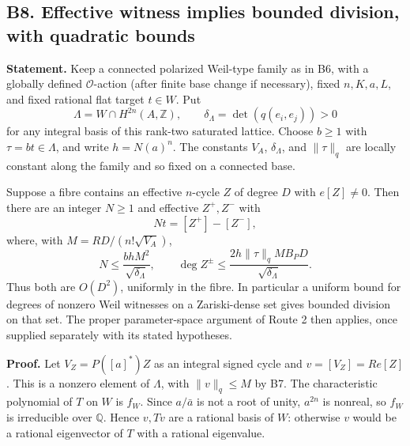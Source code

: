 \documentclass[11pt,a4paper]{article}
\theoremstyle{definition}
\begin{document}
\subsection{B8. Effective witness implies bounded division, with quadratic bounds}\label{b8.-effective-witness-implies-bounded-division-with-quadratic-bounds}

\textbf{Statement.} Keep a connected polarized Weil-type family as in B6, with a globally defined \(\mathcal O\)-action (after finite base change if necessary), fixed \(n,K,a,L\), and fixed rational flat target \(t\in W\). Put \[
 \Lambda=W\cap H^{2n}(A,\mathbb Z),\qquad \delta_\Lambda=\det(q(e_i,e_j))>0
\] for any integral basis of this rank-two saturated lattice. Choose \(b\geq1\) with \(\tau=bt\in\Lambda\), and write \(h=N(a)^n\). The constants \(V_A\), \(\delta_\Lambda\), and \(\|\tau\|_q\) are locally constant along the family and so fixed on a connected base.

Suppose a fibre contains an effective \(n\)-cycle \(Z\) of degree \(D\) with \(e[Z]\ne0\). Then there are an integer \(N\geq1\) and effective \(Z^+,Z^-\) with \[
 Nt=[Z^+]-[Z^-],
\] where, with \(M=RD/(n!\sqrt{V_A})\), \[
 N\leq\frac{b h M^2}{\sqrt{\delta_\Lambda}},\qquad
 \deg Z^\pm\leq\frac{2h\|\tau\|_q M B_P D}{\sqrt{\delta_\Lambda}}.
\] Thus both are \(O(D^2)\), uniformly in the fibre. In particular a uniform bound for degrees of nonzero Weil witnesses on a Zariski-dense set gives bounded division on that set. The proper parameter-space argument of Route 2 then applies, once supplied separately with its stated hypotheses.

\textbf{Proof.} Let \(V_Z=P([a]^*)Z\) as an integral signed cycle and \(v=[V_Z]=R e[Z]\). This is a nonzero element of \(\Lambda\), with \(\|v\|_q\leq M\) by B7. The characteristic polynomial of \(T\) on \(W\) is \(f_W\). Since \(a/\bar a\) is not a root of unity, \(a^{2n}\) is nonreal, so \(f_W\) is irreducible over \(\mathbb Q\). Hence \(v,Tv\) are a rational basis of \(W\): otherwise \(v\) would be a rational eigenvector of \(T\) with a rational eigenvalue.
\end{document}
